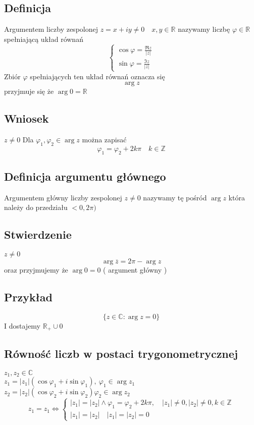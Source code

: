 \documentclass[11pt]{article}
\begin{document}
\subsection{Definicja}
Argumentem liczby zespolonej $z = x + iy \not = 0 \quad x,y \in \mathbb{R}$ nazywamy liczbę $ \varphi \in \mathbb{R}$ spełniającą układ równań 
$$\begin{cases}
\cos{\varphi} = \frac{\Re{z}}{|z|} \\
\sin{\varphi} = \frac{\Im{z}}{|z|} 
\end{cases}$$
Zbiór $\varphi$ spełniających ten układ równań oznacza się
$$ \arg{z} $$
przyjmuje się że $\arg 0 = \mathbb{R}$
\subsection{Wniosek}
$z \not = 0$
Dla $\varphi_1,\varphi_2 \in \arg{z}$ można zapisać
$$ \varphi_1 = \varphi_2 + 2k\pi \quad k \in \mathbb{Z}$$

\subsection{Definicja argumentu głównego}
Argumentem główny liczby zespolonej $z \not = 0 $ nazywamy tę pośród $\arg z$ która należy do przedziału $<0,2\pi)$
\subsection{Stwierdzenie}
$z \not = 0$
$$ \arg{\overline{z}} = 2\pi - \arg{z}$$
oraz przyjmujemy że $\arg{0} = 0 $ ( argument główny )
\subsection{Przykład}
$$ \{ z \in \mathbb{C} : \arg z = 0\} $$
I dostajemy $\mathbb{R}_+ \cup {0}$

\subsection{Równość liczb w postaci trygonometrycznej}
$ z_1,z_2 \in \mathbb{C}$ \\
$ z_1 = |z_1|(\cos{\varphi_1} + i\sin{\varphi_1}),\ \varphi_1 \in \arg z_1$\\
$ z_2 = |z_2|(\cos{\varphi_2} + i\sin{\varphi_2}) \varphi_2 \in \arg z_2$\\

$$ z_1 = z_1 \iff \begin{cases} |z_1| = |z_2| \wedge \varphi_1 = \varphi_2 + 2k\pi, \quad |z_1| \not = 0, |z_2| \not = 0, k \in \mathbb{Z}\\ |z_1| = |z_2|\quad |z_1| = |z_2| = 0 \end{cases}$$
\end{document}
